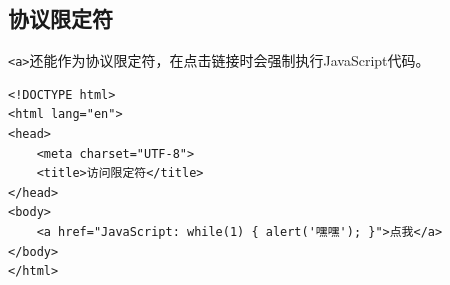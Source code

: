 \subsection{协议限定符}

\lstinline|<a>|还能作为协议限定符，在点击链接时会强制执行JavaScript代码。

\begin{lstlisting}[style=htmlcssjs, title=协议限定符]
<!DOCTYPE html>
<html lang="en">
<head>
    <meta charset="UTF-8">
    <title>访问限定符</title>
</head>
<body>
    <a href="JavaScript: while(1) { alert('嘿嘿'); }">点我</a>
</body>
</html>
\end{lstlisting}

\newpage